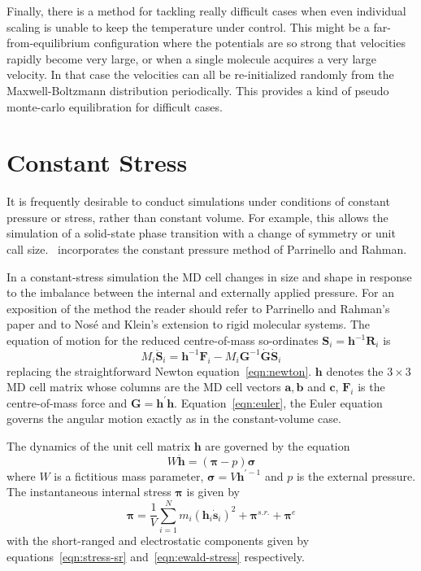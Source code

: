 Finally, there is a method for tackling really difficult cases when
even individual scaling is unable to keep the temperature under
control.  This might be a far-from-equilibrium configuration where the
potentials are so strong that velocities rapidly become very large,
or when a single molecule acquires a very large velocity.  In that
case the velocities can all be re-initialized randomly from the
Maxwell-Boltzmann distribution periodically.  This provides a kind of
pseudo monte-carlo equilibration for difficult cases.

\section{Constant Stress}%
\label{sec:const-stress}
It is frequently desirable to conduct simulations under conditions of
constant pressure or stress, rather than constant volume.  For
example, this allows the simulation of a solid-state phase transition
with a change of symmetry or unit call size.  \moldy\ incorporates the
constant pressure method of Parrinello and Rahman\cite{parrinello:81}.

In a constant-stress simulation the MD cell changes in size and shape
in response to the imbalance between the internal and externally
applied pressure.  For an exposition of the method the reader should
refer to Parrinello and Rahman's paper\cite{parrinello:81} and to
Nos\'{e} and Klein's extension to rigid molecular
systems\cite{nose:83}.  The equation of motion for the reduced
centre-of-mass so-ordinates $\bm{S}_i =
\bm{h}^{-1}\bm{R}_i$ is
\begin{equation}
\label{eqn:p&r}
M_i\ddot{\bm{S}}_i = \bm{h}^{-1} \bm{F}_i - M_i \bm{G}^{-1}\dot{\bm{G}}\dot{\bm{S}}_i
\end{equation}
replacing the straightforward Newton equation~\ref{eqn:newton}.
$\bm{h}$ denotes the $3 \times 3$ MD cell matrix whose columns are
the MD cell vectors $\bm{a}, \bm{b}$ and $\bm{c}$, $\bm{F}_i$ is the
centre-of-mass force and $\bm{G} =\bm{h^\prime h}$.
Equation~\ref{eqn:euler}, the Euler equation governs the angular
motion exactly as in the constant-volume case.

The dynamics of the unit cell matrix $\bm{h}$ are governed by the
equation
\begin{equation}
\label{eqn:rahman}
W\ddot{\bm{h}} = \left ( \bm{\pi} - p \right ) \bm{\sigma}
\end{equation}
where $W$ is a fictitious mass parameter, $\bm{\sigma} = V
\bm{h}^{\prime-1}$ and $p$ is the external pressure.  The
instantaneous internal stress $\bm{\pi}$ is given by 
\begin{equation}
\bm{\pi} = \frac{1}{V}\sum_{i=1}^N m_i (\bm{h}_i\dot{\bm{s}}_i)^2 + \bm{\pi}^{s.r.} + \bm{\pi}^e
\end{equation}
with the short-ranged and electrostatic components given by
equations~\ref{eqn:stress-sr} and~\ref{eqn:ewald-stress} respectively.

